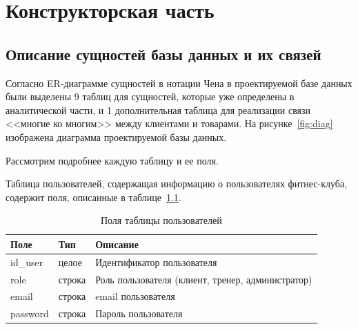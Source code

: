 \chapter{Конструкторская часть}

\section{Описание сущностей базы данных и их связей}\label{sec:сущности}

Согласно ER-диаграмме сущностей в нотации Чена в проектируемой базе данных были выделены 9 таблиц для сущностей, которые уже определены в аналитической части, и 1 дополнительная таблица для реализации связи <<многие ко многим>> между клиентами и товарами.
На рисунке~\ref{fig:diag} изображена диаграмма проектируемой базы данных.

Рассмотрим подробнее каждую таблицу и ее поля.

Таблица пользователей, содержащая информацию о пользователях фитнес-клуба, содержит поля, описанные в таблице~\ref{tbl:pol_user}.
\begin{table}[h!]
	\begin{center}
		\begin{threeparttable}
			\captionsetup{justification=raggedright,singlelinecheck=off}
			\caption{\label{tbl:pol_user} Поля таблицы пользователей}
			\begin{tabular}{|p{4cm}|p{4cm}|p{6cm}|}
				\hline
				Поле & Тип & Описание \\
				\hline
				id\_user & целое & Идентификатор пользователя \\
				\hline
				role & строка & Роль пользователя (клиент, тренер, администратор) \\
				\hline
				email & строка & email пользователя \\
				\hline
				password & строка & Пароль пользователя \\
				\hline
			\end{tabular}
		\end{threeparttable}
	\end{center}
\end{table}

